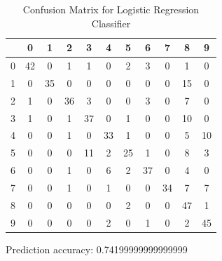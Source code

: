 \documentclass[11pt]{article}
\begin{document}
\begin{table}[!th]
\centering
\begin{tabular}{|c|cccccccccc|}
\hline
 & 0 & 1 & 2 & 3 & 4 & 5 & 6 & 7 & 8 & 9 \\
\hline
0 & 42 & 0 & 1 & 1 & 0 & 2 & 3 & 0 & 1 & 0 \\
1 & 0 & 35 & 0 & 0 & 0 & 0 & 0 & 0 & 15 & 0 \\
2 & 1 & 0 & 36 & 3 & 0 & 0 & 3 & 0 & 7 & 0 \\
3 & 1 & 0 & 1 & 37 & 0 & 1 & 0 & 0 & 10 & 0 \\
4 & 0 & 0 & 1 & 0 & 33 & 1 & 0 & 0 & 5 & 10 \\
5 & 0 & 0 & 0 & 11 & 2 & 25 & 1 & 0 & 8 & 3 \\
6 & 0 & 0 & 1 & 0 & 6 & 2 & 37 & 0 & 4 & 0 \\
7 & 0 & 0 & 1 & 0 & 1 & 0 & 0 & 34 & 7 & 7 \\
8 & 0 & 0 & 0 & 0 & 0 & 2 & 0 & 0 & 47 & 1 \\
9 & 0 & 0 & 0 & 0 & 2 & 0 & 1 & 0 & 2 & 45 \\
\hline
\end{tabular}
\caption{Confusion Matrix for Logistic Regression Classifier}
\label{ex:table}
\end{table}

Prediction accuracy: 0.74199999999999999
\end{document}
